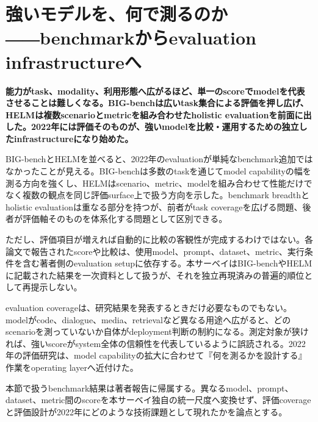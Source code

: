 \section{強いモデルを、何で測るのか――benchmarkからevaluation infrastructureへ}
\noindent\textbf{能力がtask、modality、利用形態へ広がるほど、単一のscoreでmodelを代表させることは難しくなる。BIG-benchは広いtask集合による評価を押し広げ、HELMは複数scenarioとmetricを組み合わせたholistic evaluationを前面に出した。2022年には評価そのものが、強いmodelを比較・運用するための独立したinfrastructureになり始めた。}\autocite{src-1e362767e63c,src-f02969e400b0}

BIG-benchとHELMを並べると、2022年のevaluationが単純なbenchmark追加ではなかったことが見える。BIG-benchは多数のtaskを通じてmodel capabilityの幅を測る方向を強くし、HELMはscenario、metric、modelを組み合わせて性能だけでなく複数の観点を同じ評価surface上で扱う方向を示した。benchmark breadthとholistic evaluationは重なる部分を持つが、前者がtask coverageを広げる問題、後者が評価軸そのものを体系化する問題として区別できる。\autocite{src-1e362767e63c,src-f02969e400b0}


ただし、評価項目が増えれば自動的に比較の客観性が完成するわけではない。各論文で報告されたscoreや比較は、使用model、prompt、dataset、metric、実行条件を含む著者側のevaluation setupに依存する。本サーベイはBIG-benchやHELMに記載された結果を一次資料として扱うが、それを独立再現済みの普遍的順位として再提示しない。\autocite{src-1e362767e63c,src-f02969e400b0}


evaluation coverageは、研究結果を発表するときだけ必要なものでもない。modelがcode、dialogue、media、retrievalなど異なる用途へ広がると、どのscenarioを測っていないか自体がdeployment判断の制約になる。測定対象が狭ければ、強いscoreがsystem全体の信頼性を代表しているように誤読される。2022年の評価研究は、model capabilityの拡大に合わせて『何を測るかを設計する』作業をoperating layerへ近付けた。\autocite{src-1e362767e63c,src-f02969e400b0}


\begin{claimboundary}
本節で扱うbenchmark結果は著者報告に帰属する。異なるmodel、prompt、dataset、metric間のscoreを本サーベイ独自の統一尺度へ変換せず、評価coverageと評価設計が2022年にどのような技術課題として現れたかを論点とする。\autocite{src-1e362767e63c,src-f02969e400b0}
\end{claimboundary}
